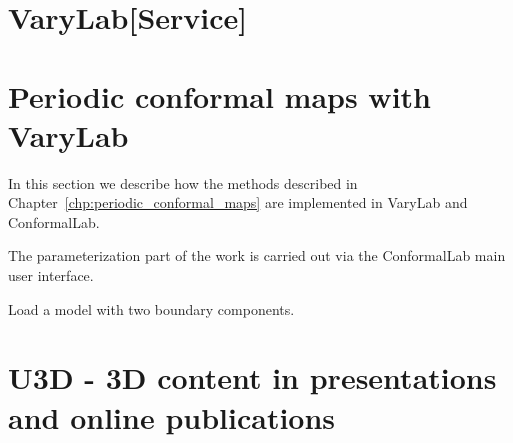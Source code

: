 \documentclass[Thesis.tex]{subfiles}
\begin{document}
\section{{\sc VaryLab[Service]}}


\section{Periodic conformal maps with {\sc VaryLab}}
In this section we describe how the methods described in Chapter~\ref{chp:periodic_conformal_maps} are implemented in {\sc VaryLab} and {\sc ConformalLab}. 

The parameterization part of the work is carried out via the {\sc ConformalLab} main user interface. 

Load a model with two boundary components. 

\section{{\sc U3D} - 3D content in presentations and online publications}
\label{sec:u3d}

\subfilebibliography
\end{document}
